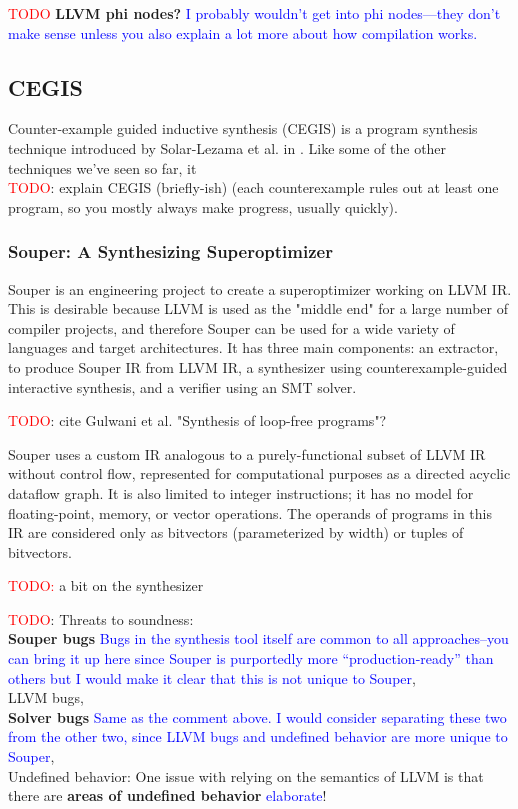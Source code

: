 \documentclass[12pt,twoside]{reedthesis}
\newcommand{\red}[1]{\textcolor{red}{#1}}
\newcommand{\comment}[2]{\textbf{#1} \textcolor{blue}{#2}}
\begin{document}
\red{TODO} \comment{LLVM phi nodes?}{I probably wouldn't get into phi nodes---they don't make sense unless you also explain a lot more about how compilation works.}

\subsection{CEGIS}
Counter-example guided inductive synthesis (CEGIS) is a program synthesis technique introduced by Solar-Lezama et al. in \cite{solar-lezama2006sketch}.
Like some of the other techniques we've seen so far, it
\\  \red{TODO}: explain CEGIS (briefly-ish) (each counterexample rules out at least one program, so you mostly always make progress, usually quickly).

\subsubsection{Souper: A Synthesizing Superoptimizer}
Souper \cite{sasnauskas2017souper} is an engineering project to create a superoptimizer working on LLVM IR.
This is desirable because LLVM is used as the "middle end" for a large number of compiler projects, and therefore Souper can be used for a wide variety of languages and target architectures.
It has three main components:
    an extractor, to produce Souper IR from LLVM IR,
    a synthesizer using counterexample-guided interactive synthesis,
    and a verifier using an SMT solver.
    
    \red{TODO}: cite Gulwani et al. "Synthesis of loop-free programs"?
    
Souper uses a custom IR analogous to a purely-functional subset of LLVM IR without control flow\footnotemark, represented for computational purposes as a directed acyclic dataflow graph.
It is also limited to integer instructions; it has no model for floating-point, memory, or vector operations.
The operands of programs in this IR are considered only as bitvectors (parameterized by width) or tuples of bitvectors.

    
    \red{TODO:} a bit on the synthesizer
    
    \red{TODO}: Threats to soundness:
     \\ \comment{Souper bugs}{Bugs in the synthesis tool itself are common to all approaches--you can bring it up here since Souper is purportedly more ``production-ready'' than others but I would make it clear that this is not unique to Souper},
     \\ LLVM bugs,
     \\ \comment{Solver bugs}{Same as the comment above. I would consider separating these two from the other two, since LLVM bugs and undefined behavior are more unique to Souper},
     \\ Undefined behavior: One issue with relying on the semantics of LLVM is that there are \comment{areas of undefined behavior}{elaborate}!
\end{document}
